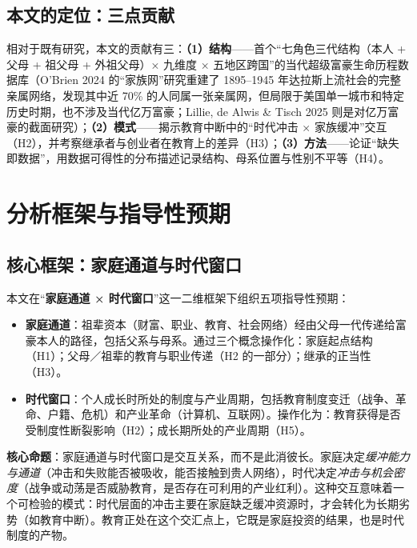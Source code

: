 \documentclass[UTF8,a4paper,11pt]{ctexart}
\begin{document}
\subsection{本文的定位：三点贡献}

相对于既有研究，本文的贡献有三：\textbf{（1）结构}——首个“七角色三代结构（本人 + 父母 + 祖父母 + 外祖父母）× 九维度 × 五地区跨国”的当代超级富豪生命历程数据库（O'Brien 2024 的“家族网”研究重建了 1895--1945 年达拉斯上流社会的完整亲属网络，发现其中近 70\% 的人同属一张亲属网，但局限于美国单一城市和特定历史时期，也不涉及当代亿万富豪；Lillie, de Alwis \& Tisch 2025 则是对亿万富豪的截面研究）；\textbf{（2）模式}——揭示教育中断中的“时代冲击 × 家族缓冲”交互（H2），并考察继承者与创业者在教育上的差异（H3）；\textbf{（3）方法}——论证“缺失即数据”，用数据可得性的分布描述记录结构、母系位置与性别不平等（H4）。

\section{分析框架与指导性预期}
\label{sec:theory}

\subsection{核心框架：家庭通道与时代窗口}

本文在“\textbf{家庭通道 × 时代窗口}”这一二维框架下组织五项指导性预期：

\begin{itemize}
\item \textbf{家庭通道}：祖辈资本（财富、职业、教育、社会网络）经由父母一代传递给富豪本人的路径，包括父系与母系。通过三个概念操作化：家庭起点结构（H1）；父母／祖辈的教育与职业传递（H2 的一部分）；继承的正当性（H3）。
\item \textbf{时代窗口}：个人成长时所处的制度与产业周期，包括教育制度变迁（战争、革命、户籍、危机）和产业革命（计算机、互联网）。操作化为：教育获得是否受制度性断裂影响（H2）；成长期所处的产业周期（H5）。
\end{itemize}

\textbf{核心命题}：家庭通道与时代窗口是交互关系，而不是此消彼长。家庭决定\emph{缓冲能力与通道}（冲击和失败能否被吸收，能否接触到贵人网络），时代决定\emph{冲击与机会密度}（战争或动荡是否威胁教育，是否存在可利用的产业红利）。这种交互意味着一个可检验的模式：时代层面的冲击主要在家庭缺乏缓冲资源时，才会转化为长期劣势（如教育中断）。教育正处在这个交汇点上，它既是家庭投资的结果，也是时代制度的产物。
\end{document}
